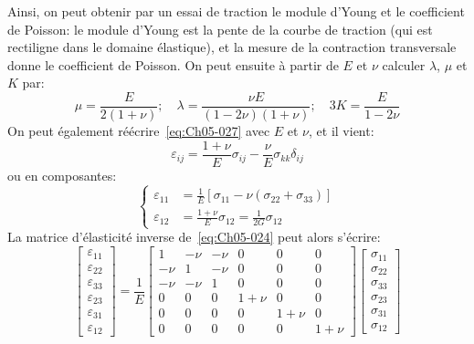 Ainsi, on peut obtenir par un essai de traction le module d'Young et le coefficient de Poisson: le module d'Young est la pente de la courbe de traction (qui est rectiligne dans le domaine élastique), et la mesure de la contraction transversale donne le coefficient de Poisson.
On peut ensuite à partir de $E$ et $\nu$ calculer $\lambda$, $\mu$ et $K$ par: 
\begin{equation}
    \mu = \frac{E}{2 \left( 1+\nu \right)}; \quad \lambda = \frac{\nu E}{\left( 1 - 2 \nu \right)\left( 1 + \nu \right)}; \quad 3 K = \frac{E}{1 - 2\nu}
    \label{eq:Ch05-033}
\end{equation}
On peut également réécrire~\eqref{eq:Ch05-027} avec $E$ et $\nu$, et il vient: 
\begin{equation}
    \varepsilon_{ij} = \frac{1 + \nu}{E} \sigma_{ij} - \frac{\nu}{E} \sigma_{kk} \delta_{ij}
    \label{eq:Ch05-034}
\end{equation}
ou en composantes: 
\begin{equation}
    \left\{
    \begin{aligned}
        \varepsilon_{11} &= \frac{1}{E} \left[ \sigma_{11} - \nu \left( \sigma_{22} + \sigma_{33}\right) \right] \\
        \varepsilon_{12} &= \frac{1+ \nu}{E} \sigma_{12} = \frac{1}{2G} \sigma_{12}
    \end{aligned}\right.
    \label{eq:Ch05-035}
\end{equation}
La matrice d'élasticité inverse de~\eqref{eq:Ch05-024} peut alors s'écrire: 
\begin{equation}
    \begin{bmatrix}
        \varepsilon_{11}\\
        \varepsilon_{22}\\
        \varepsilon_{33}\\
        \varepsilon_{23}\\
        \varepsilon_{31}\\
        \varepsilon_{12}
    \end{bmatrix}
    =
    \frac{1}{E}
    \begin{bmatrix}
        1    & -\nu & -\nu & 0     & 0     & 0 \\
        -\nu & 1    & -\nu & 0     & 0     & 0 \\
        -\nu & -\nu & 1    & 0     & 0     & 0 \\
        0    & 0    & 0    & 1+\nu & 0     & 0 \\
        0    & 0    & 0    & 0     & 1+\nu & 0 \\
        0    & 0    & 0    & 0     & 0     & 1+\nu
    \end{bmatrix}
    \begin{bmatrix}
        \sigma_{11}\\
        \sigma_{22}\\
        \sigma_{33}\\
        \sigma_{23}\\
        \sigma_{31}\\
        \sigma_{12}
    \end{bmatrix}
    \label{eq:Ch05-036}
\end{equation}
